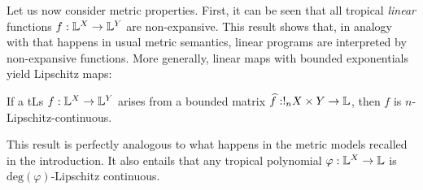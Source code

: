 \documentclass[submission,%
]{eptcs}
\begin{document}
%

Let us now consider metric properties. First, it can be seen that all tropical \emph{linear} functions $f: \mathbb{L}^{X}\to \mathbb{L}^{Y}$ are non-expansive. 
This result shows that, in analogy with that happens in usual metric semantics, linear programs are interpreted by non-expansive functions. 
More generally, linear maps with bounded exponentials yield Lipschitz maps:
\begin{proposition}\label{prop:boundedlip}
If a tLs $f: \mathbb{L}^{X}\to \mathbb{L}^{Y}$ arises from a bounded matrix $\widehat{f}:!_{n}X\times Y\to \mathbb{L}$, then $f$ is $n$-Lipschitz-continuous.
\end{proposition}
This result is perfectly analogous to what happens in the metric models recalled in the introduction. %
It also entails that any tropical polynomial $\varphi:\mathbb{L}^{X}\to\mathbb{L}$ is $\mathrm{deg}(\varphi)$-Lipschitz continuous.
\end{document}
